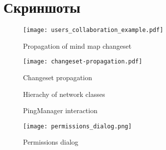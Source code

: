 \newpage
\appendix
{}
\chapter{Скриншоты}

\begin{figure}[!h]
  \centering
  \texttt{[image: users\_collaboration\_example.pdf]}
  \caption{Propagation of mind map changeset}
  \label{users_collaboration_example}
\end{figure} 

\begin{figure}
  \centering
  \texttt{[image: changeset-propagation.pdf]}
  \caption{Changeset propagation}
  \label{Changeset propagation}
\end{figure}

\begin{figure}
\begin{minipage}[t]{0.64\linewidth}
  \caption{Hierachy of network classes}
  \label{Network classes}
\end{minipage}
\hfill
\begin{minipage}[t]{0.34\linewidth}
  \caption{PingManager interaction}
  \label{Ping manager}
\end{minipage}
\end{figure}

\begin{figure}[b] \centering
  \texttt{[image: permissions\_dialog.png]}
  \caption{Permissions dialog}
  \label{Permissions dialog}
\end{figure}